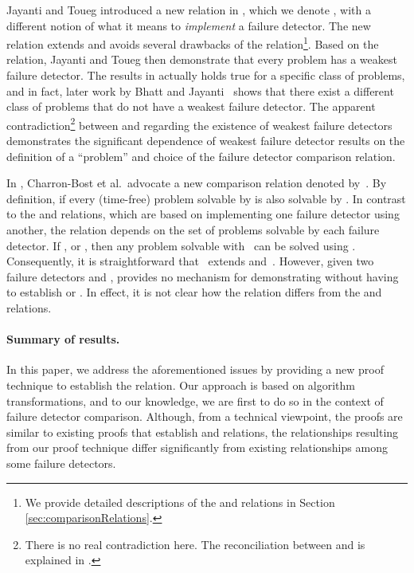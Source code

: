 \documentclass[11pt]{article}
\begin{document}
Jayanti and Toueg introduced a new relation in \cite{jayanti:ephawfd},
     which we denote , with a different notion of what it
     means to \emph{implement} a failure detector.
The new relation  extends  and avoids several
     drawbacks of the  relation\footnote{We provide detailed
     descriptions of the  and  relations in Section
     \ref{sec:comparisonRelations}.}.
Based on the  relation, Jayanti and Toueg then demonstrate
     that every problem has a weakest failure detector.
The results in \cite{jayanti:ephawfd} actually holds true for a
     specific class of problems, and in fact, later work by Bhatt and
     Jayanti~\cite{bhatt:oteow} shows that there exist a different
     class of problems that do not have a weakest failure detector.
The apparent contradiction\footnote{There is no real
     contradiction here.
The reconciliation between \cite{jayanti:ephawfd} and
     \cite{bhatt:oteow} is explained in \cite{bhatt:oteow}.} between
     \cite{jayanti:ephawfd} and \cite{bhatt:oteow} regarding the
     existence of weakest failure detectors demonstrates the
     significant dependence of weakest failure detector results on the
     definition of a ``problem''  and choice of the failure detector
     comparison relation.



In \cite{charron-bost:10:isolt}, Charron-Bost et al.\  advocate a
     new comparison relation denoted by~.
By definition,  if  every (time-free)
     problem solvable by  is also solvable by .
In contrast to the  and  relations, which are based on
     implementing one failure detector using another, the 
     relation depends on the set of problems solvable by each failure
     detector.
If , or , then any problem
     solvable with~ can be solved using .
Consequently, it is straightforward that~ extends 
     and~.
However, given two failure detectors  and ,
     \cite{charron-bost:10:isolt} provides no mechanism for
     demonstrating  without having to establish  or .
In effect, it is not clear how the  relation differs from
     the  and  relations.

\medskip

\paragraph{Summary of results.} 

In this paper, we address the aforementioned issues by providing a new
     proof technique to establish the  relation.
Our approach is based on algorithm transformations, and to our
     knowledge, we are first to do so in the context of failure
     detector comparison.
Although, from a technical viewpoint, the proofs are similar to
     existing proofs that establish  and  relations,
     the relationships resulting from our proof technique differ
     significantly from existing relationships among some failure
     detectors.
     
\end{document}
